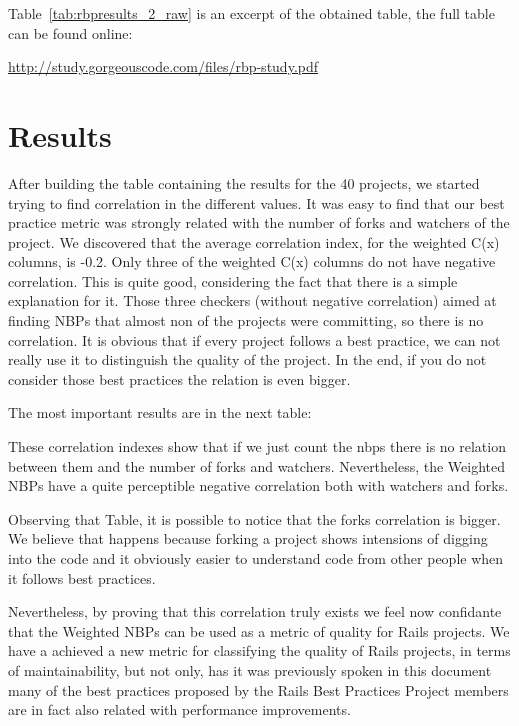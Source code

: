 
Table~\ref{tab:rbpresults_2_raw} is an excerpt of the obtained table, the full table can be found online: 

\url{http://study.gorgeouscode.com/files/rbp-study.pdf}




\section{Results}\label{subsec:results}
After building the table containing the results for the 40 projects, 
we started trying to find correlation in the different values. 
It was easy to find that our best practice metric was strongly related with the number of forks and watchers of the project.
We discovered that the average correlation index, for the weighted C(x) columns, is -0.2. 
Only three of the weighted C(x) columns do not have negative correlation. 
This is quite good, considering the fact that there is a simple explanation for it. 
Those three checkers (without negative correlation) aimed at finding NBPs that almost non of the projects were committing, 
so there is no correlation. 
It is obvious that if every project follows a best practice, we can not really use it to distinguish the quality of the project.
In the end, if you do not consider those best practices the relation is even bigger.


The most important results are in the next table:


These correlation indexes show that if we just count the nbps there is no relation between them and the number of forks and watchers. Nevertheless, the Weighted NBPs have a quite perceptible negative correlation both with watchers and forks. 

Observing that Table, it is possible to notice that the forks correlation is bigger. 
We believe that happens because forking a project shows intensions of digging into the code and 
it obviously easier to understand code from other people when it follows best practices.

Nevertheless, by proving that this correlation truly exists we feel now confidante that 
the Weighted NBPs can be used as a metric of quality for Rails projects.
We have a achieved a new metric for classifying the quality of Rails projects, in terms of maintainability,
but not only, has it was previously spoken in this document many of the best practices
proposed by the Rails Best Practices Project members are in fact also related with performance improvements.

